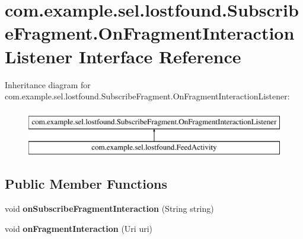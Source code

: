 \hypertarget{interfacecom_1_1example_1_1sel_1_1lostfound_1_1SubscribeFragment_1_1OnFragmentInteractionListener}{\section{com.\-example.\-sel.\-lostfound.\-Subscribe\-Fragment.\-On\-Fragment\-Interaction\-Listener Interface Reference}
\label{interfacecom_1_1example_1_1sel_1_1lostfound_1_1SubscribeFragment_1_1OnFragmentInteractionListener}
}
Inheritance diagram for com.\-example.\-sel.\-lostfound.\-Subscribe\-Fragment.\-On\-Fragment\-Interaction\-Listener\-:\begin{figure}[H]
\begin{center}
\leavevmode
\includegraphics[height=2.000000cm]{interfacecom_1_1example_1_1sel_1_1lostfound_1_1SubscribeFragment_1_1OnFragmentInteractionListener}
\end{center}
\end{figure}
\subsection*{Public Member Functions}
\begin{DoxyCompactItemize}
\item 
\hypertarget{interfacecom_1_1example_1_1sel_1_1lostfound_1_1SubscribeFragment_1_1OnFragmentInteractionListener_a49e52bf52ac045228eda481eaa5ad3a3}{void {\bfseries on\-Subscribe\-Fragment\-Interaction} (String string)}\label{interfacecom_1_1example_1_1sel_1_1lostfound_1_1SubscribeFragment_1_1OnFragmentInteractionListener_a49e52bf52ac045228eda481eaa5ad3a3}

\item 
\hypertarget{interfacecom_1_1example_1_1sel_1_1lostfound_1_1SubscribeFragment_1_1OnFragmentInteractionListener_a419de726f221023d20f573225984783b}{void {\bfseries on\-Fragment\-Interaction} (Uri uri)}\label{interfacecom_1_1example_1_1sel_1_1lostfound_1_1SubscribeFragment_1_1OnFragmentInteractionListener_a419de726f221023d20f573225984783b}

\end{DoxyCompactItemize}


